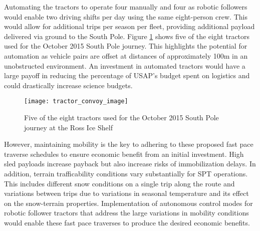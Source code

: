 Automating the tractors to operate four manually and four as robotic followers would enable two driving shifts per day using the same eight-person crew. This would allow for additional trips per season per fleet, providing additional payload delivered via ground to the South Pole. Figure \ref{fig:tractor_convoy_image} shows five of the eight tractors used for the October 2015 South Pole journey. This highlights the potential for automation as vehicle pairs are offset at distances of approximately 100m in an unobstructed environment. An investment in automated tractors would have a large payoff in reducing the percentage of USAP's budget spent on logistics and could drastically increase science budgets. 
\begin{figure}[b]
    \centering
    \texttt{[image: tractor\_convoy\_image]}
    \caption{Five of the eight tractors used for the October 2015 South Pole journey at the Ross Ice Shelf}
    \label{fig:tractor_convoy_image}
\end{figure}
However, maintaining mobility is the key to adhering to these proposed fast pace traverse schedules to ensure economic benefit from an initial investment.  High sled payloads increase payback but also increase risks of immobilization delays. In addition, terrain trafficability conditions vary substantially for SPT operations. This includes different snow conditions on a single trip along the route and variations between trips due to variations in seasonal temperature and its effect on the snow-terrain properties. Implementation of autonomous control modes for robotic follower tractors that address the large variations in mobility conditions would enable these fast pace traverses to produce the desired economic benefits.

